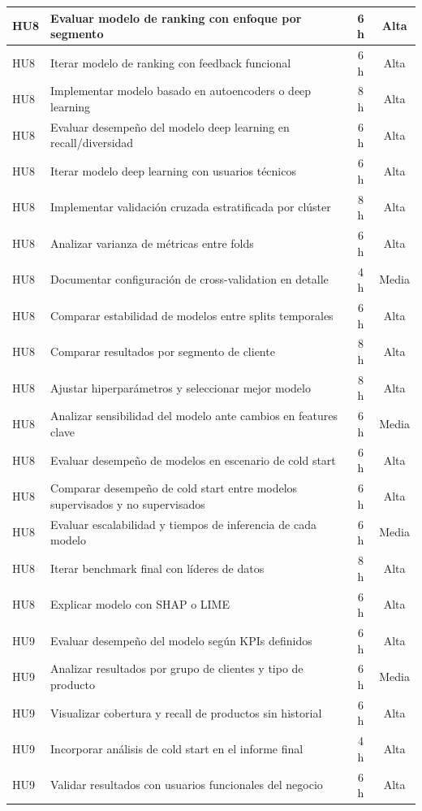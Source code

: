 \documentclass[
11pt, %
]{charter}
\begin{document}
\begin{longtable}{|p{2cm}|p{10cm}|c|c|}
HU8 & Evaluar modelo de ranking con enfoque por segmento & 6 h & Alta \\ \hline
HU8 & Iterar modelo de ranking con feedback funcional & 6 h & Alta \\ \hline
HU8 & Implementar modelo basado en autoencoders o deep learning & 8 h & Alta \\ \hline
HU8 & Evaluar desempeño del modelo deep learning en recall/diversidad & 6 h & Alta \\ \hline
HU8 & Iterar modelo deep learning con usuarios técnicos & 6 h & Alta \\ \hline
HU8 & Implementar validación cruzada estratificada por clúster & 8 h & Alta \\ \hline
HU8 & Analizar varianza de métricas entre folds & 6 h & Alta \\ \hline
HU8 & Documentar configuración de cross-validation en detalle & 4 h & Media \\ \hline
HU8 & Comparar estabilidad de modelos entre splits temporales & 6 h & Alta \\ \hline
HU8 & Comparar resultados por segmento de cliente & 8 h & Alta \\ \hline
HU8 & Ajustar hiperparámetros y seleccionar mejor modelo & 8 h & Alta \\ \hline
HU8 & Analizar sensibilidad del modelo ante cambios en features clave & 6 h & Media \\ \hline
HU8 & Evaluar desempeño de modelos en escenario de cold start & 6 h & Alta \\ \hline
HU8 & Comparar desempeño de cold start entre modelos supervisados y no supervisados & 6 h & Alta \\ \hline
HU8 & Evaluar escalabilidad y tiempos de inferencia de cada modelo & 6 h & Media \\ \hline
HU8 & Iterar benchmark final con líderes de datos & 8 h & Alta \\ \hline
HU8 & Explicar modelo con SHAP o LIME & 6 h & Alta \\ \hline
HU9 & Evaluar desempeño del modelo según KPIs definidos & 6 h & Alta \\ \hline
HU9 & Analizar resultados por grupo de clientes y tipo de producto & 6 h & Media \\ \hline
HU9 & Visualizar cobertura y recall de productos sin historial & 6 h & Alta \\ \hline
HU9 & Incorporar análisis de cold start en el informe final & 4 h & Alta \\ \hline
HU9 & Validar resultados con usuarios funcionales del negocio & 6 h & Alta \\ \hline

\end{longtable}
\end{document}

